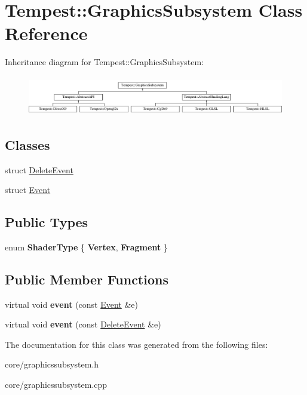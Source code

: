 \hypertarget{class_tempest_1_1_graphics_subsystem}{\section{Tempest\+:\+:Graphics\+Subsystem Class Reference}
\label{class_tempest_1_1_graphics_subsystem}
}
Inheritance diagram for Tempest\+:\+:Graphics\+Subsystem\+:\begin{figure}[H]
\begin{center}
\leavevmode
\includegraphics[height=1.740933cm]{class_tempest_1_1_graphics_subsystem}
\end{center}
\end{figure}
\subsection*{Classes}
\begin{DoxyCompactItemize}
\item 
struct \hyperlink{struct_tempest_1_1_graphics_subsystem_1_1_delete_event}{Delete\+Event}
\item 
struct \hyperlink{struct_tempest_1_1_graphics_subsystem_1_1_event}{Event}
\end{DoxyCompactItemize}
\subsection*{Public Types}
\begin{DoxyCompactItemize}
\item 
\hypertarget{class_tempest_1_1_graphics_subsystem_a92ffbf28fb07334ab59c23051eb089c3}{enum {\bfseries Shader\+Type} \{ {\bfseries Vertex}, 
{\bfseries Fragment}
 \}}\label{class_tempest_1_1_graphics_subsystem_a92ffbf28fb07334ab59c23051eb089c3}

\end{DoxyCompactItemize}
\subsection*{Public Member Functions}
\begin{DoxyCompactItemize}
\item 
\hypertarget{class_tempest_1_1_graphics_subsystem_a8c7b7a5fee3e9b20f9946c6fc2152cc0}{virtual void {\bfseries event} (const \hyperlink{struct_tempest_1_1_graphics_subsystem_1_1_event}{Event} \&e)}\label{class_tempest_1_1_graphics_subsystem_a8c7b7a5fee3e9b20f9946c6fc2152cc0}

\item 
\hypertarget{class_tempest_1_1_graphics_subsystem_a927c91646e25c44e94ffdcdfe9dffdc2}{virtual void {\bfseries event} (const \hyperlink{struct_tempest_1_1_graphics_subsystem_1_1_delete_event}{Delete\+Event} \&e)}\label{class_tempest_1_1_graphics_subsystem_a927c91646e25c44e94ffdcdfe9dffdc2}

\end{DoxyCompactItemize}


The documentation for this class was generated from the following files\+:\begin{DoxyCompactItemize}
\item 
core/graphicssubsystem.\+h\item 
core/graphicssubsystem.\+cpp\end{DoxyCompactItemize}
